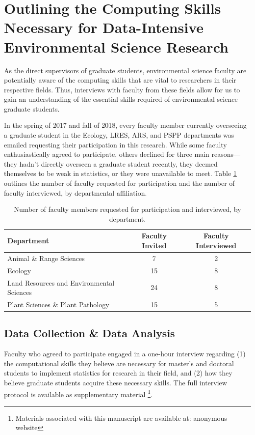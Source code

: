 \documentclass[12pt]{article}
\begin{document}
\section{Outlining the Computing Skills Necessary for Data-Intensive 
Environmental Science Research}
\label{sec:faculty}

\noindent As the direct supervisors of graduate students, environmental science
faculty are potentially aware of the computing skills that are vital to
researchers in their respective fields. Thus, interviews with faculty
from these fields allow for us to gain an understanding of the essential skills
required of environmental science graduate students. 

\quad In the spring of 2017 and fall of 2018, every faculty member
currently overseeing a graduate student in the Ecology, LRES, ARS, and PSPP
departments was emailed requesting their participation in this research. 
While some faculty enthusiastically agreed to participate, others declined for
three main reasons---they hadn't directly overseen a graduate student recently,
they deemed themselves to be weak in statistics, or they were unavailable to
meet. Table \ref{tab:faculty} outlines the number of faculty requested for
participation and the number of faculty interviewed, by departmental
affiliation. 

{
\begin{table}[h!]
\centering
\begin{tabular}{lcc}
\hline
Department & Faculty Invited & Faculty Interviewed  \\
\hline
Animal \& Range Sciences & 7 & 2 \\
Ecology & 15 & 8 \\
Land Resources and Environmental Sciences & 24 & 8 \\
Plant Sciences \& Plant Pathology &  15 & 5 \\ 
\hline
\end{tabular}
\caption{Number of faculty members requested for participation and interviewed,
by department.}
\label{tab:faculty}
\end{table}
}

\subsection{Data Collection \& Data Analysis}  

\noindent Faculty who agreed to participate engaged in a one-hour 
interview regarding (1) the computational skills they believe are necessary for
master's and doctoral students to implement statistics for research in their
field, and (2) how they believe graduate students acquire these necessary
skills. The full interview protocol is available as supplementary material 
\footnote{Materials associated with this manuscript are available at: anonymous 
website}.
\end{document}
